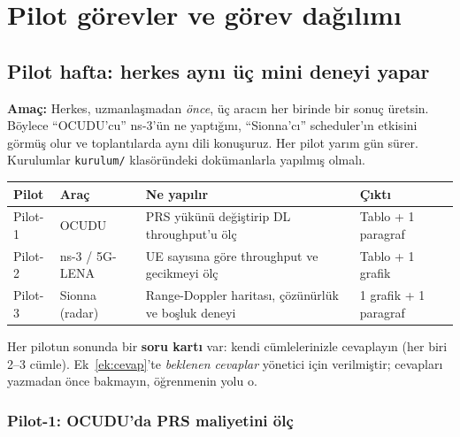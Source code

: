 \section{Pilot görevler ve görev dağılımı}\label{sec:pilot}

\subsection{Pilot hafta: herkes aynı üç mini deneyi yapar}

\textbf{Amaç:} Herkes, uzmanlaşmadan \emph{önce}, üç aracın her birinde bir sonuç üretsin. Böylece ``OCUDU'cu'' ns-3'ün ne yaptığını, ``Sionna'cı'' scheduler'ın etkisini görmüş olur
ve toplantılarda aynı dili konuşuruz. Her pilot yarım gün sürer. Kurulumlar \texttt{kurulum/} klasöründeki dokümanlarla yapılmış olmalı.

\begingroup\sffamily\small
\begin{xltabular}{\textwidth}{@{}p{2cm}p{3.6cm}Xp{2.6cm}@{}}
\toprule
\textbf{Pilot} & \textbf{Araç} & \textbf{Ne yapılır} & \textbf{Çıktı} \\
\midrule
Pilot-1 & OCUDU & PRS yükünü değiştirip DL throughput'u ölç & Tablo + 1 paragraf \\
Pilot-2 & ns-3 / 5G-LENA & UE sayısına göre throughput ve gecikmeyi ölç & Tablo + 1 grafik \\
Pilot-3 & Sionna (radar) & Range-Doppler haritası, çözünürlük ve boşluk deneyi & 1 grafik + 1 paragraf \\
\bottomrule
\end{xltabular}
\endgroup

Her pilotun sonunda bir \textbf{soru kartı} var: kendi cümlelerinizle cevaplayın (her biri 2--3 cümle). Ek~\ref{ek:cevap}'te \emph{beklenen cevaplar} yönetici için verilmiştir;
cevapları yazmadan önce bakmayın, öğrenmenin yolu o.

\subsubsection{Pilot-1: OCUDU'da PRS maliyetini ölç}

